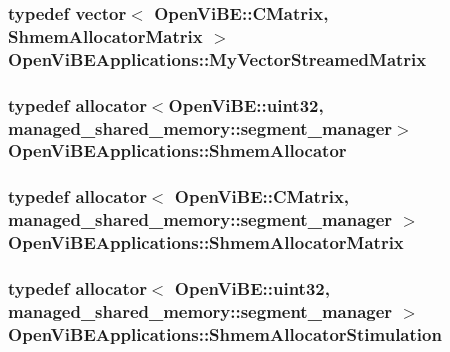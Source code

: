 \label{namespaceOpenViBEApplications_a76138bc86fc2d1d552722e25bdcaf890}
\hypertarget{namespaceOpenViBEApplications_a49e9170dae207ef828da8396979a89da}{
\subsubsection[{MyVectorStreamedMatrix}]{\setlength{\rightskip}{0pt plus 5cm}typedef vector$<$ OpenViBE::CMatrix, {\bf ShmemAllocatorMatrix} $>$ {\bf OpenViBEApplications::MyVectorStreamedMatrix}}}
\label{namespaceOpenViBEApplications_a49e9170dae207ef828da8396979a89da}
\hypertarget{namespaceOpenViBEApplications_afda96459860c5ef7c820d01b5ce03bb0}{
\subsubsection[{ShmemAllocator}]{\setlength{\rightskip}{0pt plus 5cm}typedef allocator$<$OpenViBE::uint32, managed\_\-shared\_\-memory::segment\_\-manager$>$ {\bf OpenViBEApplications::ShmemAllocator}}}
\label{namespaceOpenViBEApplications_afda96459860c5ef7c820d01b5ce03bb0}
\hypertarget{namespaceOpenViBEApplications_a3ea9362fb7313956afc9130a80eb0078}{
\subsubsection[{ShmemAllocatorMatrix}]{\setlength{\rightskip}{0pt plus 5cm}typedef allocator$<$ OpenViBE::CMatrix, managed\_\-shared\_\-memory::segment\_\-manager $>$ {\bf OpenViBEApplications::ShmemAllocatorMatrix}}}
\label{namespaceOpenViBEApplications_a3ea9362fb7313956afc9130a80eb0078}
\hypertarget{namespaceOpenViBEApplications_a5ea079d882839a99bd5c76715c9a450d}{
\subsubsection[{ShmemAllocatorStimulation}]{\setlength{\rightskip}{0pt plus 5cm}typedef allocator$<$ OpenViBE::uint32, managed\_\-shared\_\-memory::segment\_\-manager $>$ {\bf OpenViBEApplications::ShmemAllocatorStimulation}}}
\label{namespaceOpenViBEApplications_a5ea079d882839a99bd5c76715c9a450d}


